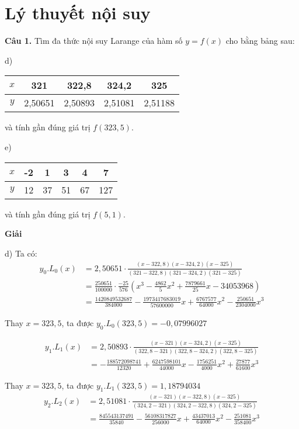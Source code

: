 \chapter{Lý thuyết nội suy}
\textbf{Câu 1.} Tìm đa thức nội suy Larange của hàm số $y=f(x)$ cho bằng bảng sau:\par
\begin{multicols}{2}
d)\begin{center}\begin{tabular}{|c|c|c|c|c|}\hline
	$x$&321&322,8&324,2&325\\ \hline
	$y$&2,50651&2,50893&2,51081&2,51188\\ \hline
\end{tabular}\end{center}
và tính gần đúng giá trị $f(323,5)$.\par
e)\begin{center}\begin{tabular}{|c|c|c|c|c|c|}
	\hline
	$x$&-2&1&3&4&7\\ \hline
	$y$&12&37&51&67&127\\ \hline
\end{tabular}\end{center}
và tính gần đúng giá trị $f(5,1)$.\par
\end{multicols}

\textbf{Giải}\par
d) Ta có:
\begin{align*}
	y_0.L_0(x)	& =2,50651\cdot\frac{(x-322,8)(x-324,2)(x-325)}{(321-322,8)(321-324,2)(321-325)}\\
				& =\frac{250651}{100000}\cdot\frac{-25}{576}\left(x^3-\frac{4862}{5}x^2+\frac{7879661}{25}x-34053968\right)\\
				& =\frac{1420849532687}{384000}-\frac{1973417683019}{57600000}x+\frac{6767577}{64000}x^2-\frac{250651}{2304000}x^3
\end{align*}

Thay $x=323,5$, ta được $y_0.L_0(323,5)=-0,07996027$\par
\begin{align*}
	y_1.L_1(x)	& =2,50893\cdot\frac{(x-321)(x-324,2)(x-325)}{(322,8-321)(322,8-324,2)(322,8-325)}\\
				& =-\frac{188572098741}{12320}+\frac{6247598101}{44000}x-\frac{1756251}{4000}x^2+\frac{27877}{61600}x^3
\end{align*}

Thay $x=323,5$, ta được $y_1.L_1(323,5)=1,18794034$
\begin{align*}
	y_2.L_2(x)	& =2,51081\cdot\frac{(x-321)(x-322,8)(x-325)}{(324,2-321)(324,2-322,8)(324,2-325)}\\
				& =\frac{845543137491}{35840}-\frac{56108317827}{256000}x+\frac{43437013}{64000}x^2-\frac{251081}{358400}x^3
\end{align*}

